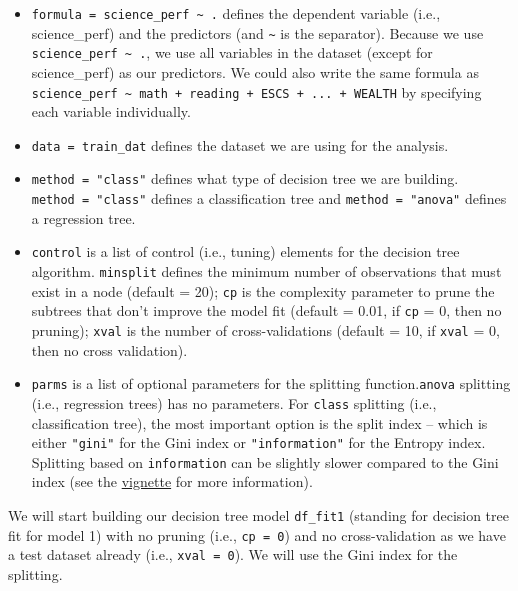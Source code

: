 \documentclass[]{book}
\providecommand{\tightlist}{%
  \setlength{\itemsep}{0pt}\setlength{\parskip}{0pt}}
\begin{document}
\begin{itemize}
\tightlist
\item
  \texttt{formula\ =\ science\_perf\ \textasciitilde{}\ .} defines the dependent variable (i.e., science\_perf) and the predictors (and \texttt{\textasciitilde{}} is the separator). Because we use \texttt{science\_perf\ \textasciitilde{}\ .}, we use all variables in the dataset (except for science\_perf) as our predictors. We could also write the same formula as \texttt{science\_perf\ \textasciitilde{}\ math\ +\ reading\ +\ ESCS\ +\ ...\ +\ WEALTH} by specifying each variable individually.
\item
  \texttt{data\ =\ train\_dat} defines the dataset we are using for the analysis.
\item
  \texttt{method\ =\ "class"} defines what type of decision tree we are building. \texttt{method\ =\ "class"} defines a classification tree and \texttt{method\ =\ "anova"} defines a regression tree.
\item
  \texttt{control} is a list of control (i.e., tuning) elements for the decision tree algorithm. \texttt{minsplit} defines the minimum number of observations that must exist in a node (default = 20); \texttt{cp} is the complexity parameter to prune the subtrees that don't improve the model fit (default = 0.01, if \texttt{cp} = 0, then no pruning); \texttt{xval} is the number of cross-validations (default = 10, if \texttt{xval} = 0, then no cross validation).
\item
  \texttt{parms} is a list of optional parameters for the splitting function.\texttt{anova} splitting (i.e., regression trees) has no parameters. For \texttt{class} splitting (i.e., classification tree), the most important option is the split index -- which is either \texttt{"gini"} for the Gini index or \texttt{"information"} for the Entropy index. Splitting based on \texttt{information} can be slightly slower compared to the Gini index (see the \href{https://cran.r-project.org/web/packages/rpart/vignettes/longintro.pdf}{vignette} for more information).
\end{itemize}

We will start building our decision tree model \texttt{df\_fit1} (standing for decision tree fit for model 1) with no pruning (i.e., \texttt{cp\ =\ 0}) and no cross-validation as we have a test dataset already (i.e., \texttt{xval\ =\ 0}). We will use the Gini index for the splitting.
\end{document}

